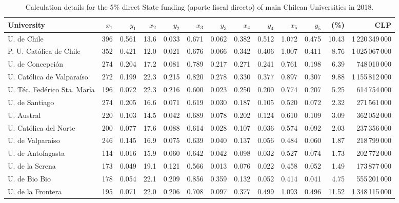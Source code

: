 \documentclass[twocolumn]{article}
\begin{document}
\begin{table}
\caption{Calculation details for the 5\% direct State funding (aporte fiscal 
directo) of main Chilean Universities in 2018.}
\label{tab:calcdetail}
\centering\footnotesize
\begin{tabular}{l rrrrrrrrrr rr}
\hline\hline
University                 &$x_1$& $y_1$ &$x_2$ & $y_2$ & $x_3$ & $y_3$ & $x_4$ & $y_4$ & $x_5$ & $y_5$ &  (\%) & CLP\\
\hline
U. de Chile                & 396 & 0.561 & 13.6 & 0.033 & 0.671 & 0.062 & 0.382 & 0.512 & 1.072 & 0.475 & 10.43 & 1\,220\,349\,000\\
P. U. Católica de Chile    & 352 & 0.421 & 12.0 & 0.021 & 0.676 & 0.066 & 0.342 & 0.406 & 1.007 & 0.411 &  8.76 & 1\,025\,067\,000\\
U. de Concepción           & 274 & 0.204 & 17.2 & 0.081 & 0.789 & 0.217 & 0.271 & 0.241 & 0.761 & 0.198 &  6.39 &    748\,010\,000\\
U. Católica de Valparaíso  & 272 & 0.199 & 22.3 & 0.215 & 0.820 & 0.278 & 0.330 & 0.377 & 0.897 & 0.307 &  9.88 & 1\,155\,812\,000\\
U. Téc. Fedérico Sta. María& 196 & 0.072 & 22.3 & 0.216 & 0.600 & 0.023 & 0.250 & 0.200 & 0.774 & 0.207 &  5.25 &    614\,754\,000\\
U. de Santiago             & 274 & 0.205 & 16.6 & 0.071 & 0.619 & 0.030 & 0.187 & 0.105 & 0.520 & 0.072 &  2.32 &    271\,561\,000\\
U. Austral                 & 220 & 0.103 & 14.5 & 0.042 & 0.689 & 0.078 & 0.202 & 0.124 & 0.610 & 0.109 &  3.09 &    362\,052\,000\\
U. Católica del Norte      & 200 & 0.077 & 17.6 & 0.088 & 0.614 & 0.028 & 0.107 & 0.036 & 0.574 & 0.092 &  2.03 &    237\,356\,000\\
U. de Valparaíso           & 246 & 0.145 & 16.9 & 0.075 & 0.639 & 0.040 & 0.137 & 0.056 & 0.484 & 0.060 &  1.87 &    218\,799\,000\\
U. de Antofagasta          & 114 & 0.016 & 15.9 & 0.060 & 0.642 & 0.042 & 0.098 & 0.032 & 0.527 & 0.074 &  1.73 &    202\,772\,000\\
U. de la Serena            & 173 & 0.049 & 19.1 & 0.121 & 0.566 & 0.013 & 0.076 & 0.022 & 0.458 & 0.052 &  1.49 &    173\,877\,000\\
U. de Bio Bio              & 178 & 0.054 & 22.1 & 0.209 & 0.856 & 0.359 & 0.132 & 0.052 & 0.414 & 0.041 &  4.75 &    555\,201\,000\\
U. de la Frontera          & 195 & 0.071 & 22.0 & 0.206 & 0.708 & 0.097 & 0.377 & 0.499 & 1.093 & 0.496 & 11.52 & 1\,348\,115\,000\\

\end{tabular}
\end{table}
\end{document}
